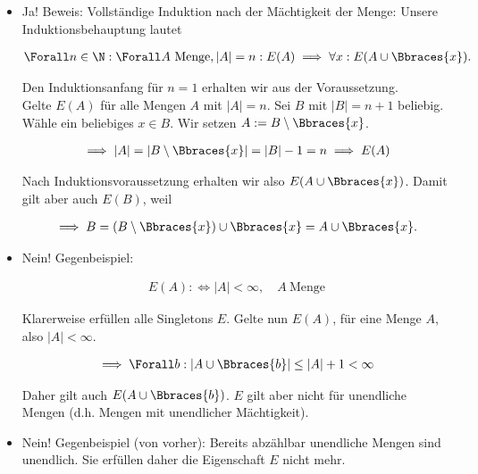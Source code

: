 \begin{solution}

  \phantom{}

  \begin{itemize}

    \item Ja!
    Beweis:
    Vollständige Induktion nach der Mächtigkeit der Menge:
    Unsere Induktionsbehauptung lautet

    \begin{align*}
      \Forall n \in \N:
      \Forall A ~\text{Menge}, |A| = n:
      E(A) \implies \forall x: E(A \cup \Bbraces{x}).
    \end{align*}
    
    Den Induktionsanfang für $n = 1$ erhalten wir aus der Voraussetzung. \\
    Gelte $E(A)$ für alle Mengen $A$ mit $|A| = n$.
    Sei $B$ mit $|B| = n + 1$ beliebig.
    Wähle ein beliebiges $x \in B$.
    Wir setzen $A := B \setminus \Bbraces{x}$.

    \begin{align*}
      \implies
      |A| = |B \setminus \Bbraces{x}| = |B| - 1 = n
      \implies
      E(A)
    \end{align*}

    Nach Induktionsvoraussetzung erhalten wir also $E(A \cup \Bbraces{x})$.
    Damit gilt aber auch $E(B)$, weil

    \begin{align*}
      \implies
      B = (B \setminus \Bbraces{x}) \cup \Bbraces{x}
      =
      A \cup \Bbraces{x}.
    \end{align*}
  
    \item Nein!
    Gegenbeispiel:

    \begin{align*}
      E(A) :\iff |A| < \infty,
      \quad
      A ~\text{Menge}
    \end{align*}

    Klarerweise erfüllen alle Singletons $E$.
    Gelte nun $E(A)$, für eine Menge $A$, also $|A| < \infty$.

    \begin{align*}
      \implies
      \Forall b:
      |A \cup \Bbraces{b}| \leq |A| + 1 < \infty
    \end{align*}
    
    Daher gilt auch $E(A \cup \Bbraces{b})$.
    $E$ gilt aber nicht für unendliche Mengen (d.h. Mengen mit unendlicher Mächtigkeit).

    \item Nein!
    Gegenbeispiel (von vorher):
    Bereits abzählbar unendliche Mengen sind unendlich.  
    Sie erfüllen daher die Eigenschaft $E$ nicht mehr.

  \end{itemize}

\end{solution}

